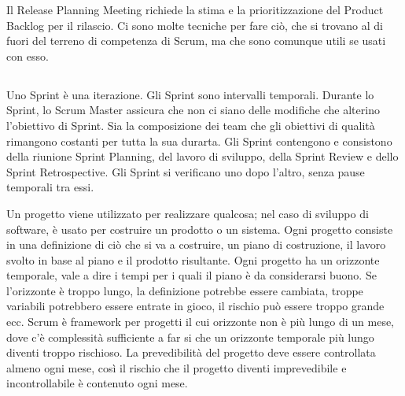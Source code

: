 Il Release Planning Meeting richiede la stima e la prioritizzazione del Product Backlog per il rilascio. Ci sono molte tecniche per
fare ci\`o, che si trovano al di fuori del terreno di competenza di Scrum, ma che sono comunque utili se usati con esso.

\subsection*{\color{Blue}{SPRINT}}
\label{sec:sprint}
Uno Sprint \`e una iterazione. Gli Sprint sono intervalli temporali. Durante lo Sprint, lo Scrum Master assicura che
non ci siano delle modifiche che alterino l'obiettivo di Sprint. Sia la composizione dei team che gli obiettivi di
qualit\`a rimangono costanti per tutta la sua durarta. Gli Sprint contengono e consistono della riunione Sprint
Planning, del lavoro di sviluppo, della Sprint Review e dello Sprint Retrospective. Gli Sprint si verificano uno dopo
l'altro, senza pause temporali tra essi.


Un progetto viene utilizzato per realizzare qualcosa; nel caso di sviluppo di software, \`e usato per costruire un
prodotto o un sistema. Ogni progetto consiste in una definizione di ci\`o che si va a costruire, un piano di
costruzione, il lavoro svolto in base al piano e il prodotto risultante. Ogni progetto ha un orizzonte temporale, vale
a dire i tempi per i quali il piano \`e da considerarsi buono. Se l'orizzonte \`e troppo lungo, la definizione potrebbe
essere cambiata, troppe variabili potrebbero essere entrate in gioco, il rischio pu\`o essere troppo grande ecc. Scrum \`e framework
per progetti il cui orizzonte non \`e pi\`u lungo di un mese, dove c'\`e complessit\`a sufficiente a far si che un
orizzonte temporale pi\`u lungo diventi troppo rischioso. La prevedibilit\`a del progetto deve essere controllata
almeno ogni mese, cos\`i il rischio che il progetto diventi imprevedibile e incontrollabile \`e contenuto ogni mese.


